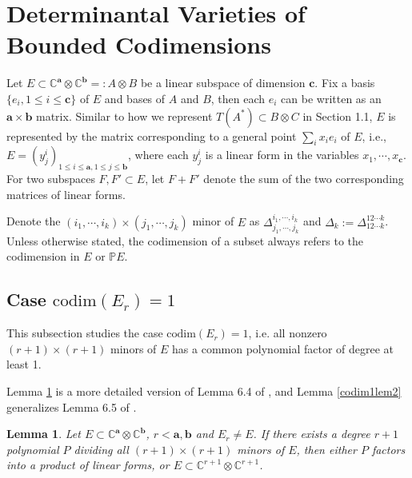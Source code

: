\documentclass[10pt]{article} %
\newcommand{\aaa}{\mathbf{a}}
\newcommand{\bbb}{\mathbf{b}}
\newcommand{\ccc}{\mathbf{c}}
\newcommand{\ot}{\otimes}
\newtheorem{lem}[thm]{Lemma}
\theoremstyle{definition}
\begin{document}
\section{Determinantal Varieties of Bounded Codimensions}\label{section:determinantal}
Let $E\subset\mathbb{C}^{\aaa}\otimes\mathbb{C}^{\bbb}=:A\otimes B$ be a linear subspace of dimension $\ccc$. Fix a basis $\{e_i,1\leq i \leq \ccc\}$ of $E$ and bases of $A$ and $B$, then each $e_i$ can be written as an $\aaa\times\bbb$ matrix. Similar to how we represent $T(A^*)\subset B\ot C$ in Section 1.1, $E$ is represented by the matrix corresponding to a general point $\sum_i x_ie_i$ of $E$, i.e., $E=(y^i_j)_{1\leq i\leq \aaa,1\leq j\leq \bbb}$, where each $y^i_j$ is a linear form in the variables $x_1,\cdots,x_{\ccc}$. For two subspaces $F,F'\subset E$, let $F+F'$ denote the sum of the two corresponding matrices of linear forms. 

Denote the $(i_1,\cdots,i_k)\times(j_1,\cdots,j_k)$ minor of $E$ as $\Delta^{i_1,\cdots,i_k}_{j_1,\cdots,j_k}$ and $\Delta_k:=\Delta^{12\cdots k}_{12\cdots k}$. Unless otherwise stated, the codimension of a subset always refers to the codimension in $E$ or $\mathbb{P}E$. 

\subsection{Case $\mathrm{codim}(E_r)=1$}
This subsection studies the case $\mathrm{codim}(E_r)=1$, i.e. all nonzero $(r+1)\times(r+1)$ minors of $E$ has a common polynomial factor of degree at least 1. 

Lemma \ref{codim1lem} is a more detailed version of Lemma 6.4 of \cite{GL20}, and Lemma \ref{codim1lem2} generalizes Lemma 6.5 of \cite{GL20}.

\begin{lem}\label{codim1lem}
Let $E\subset\mathbb{C}^{\aaa}\otimes\mathbb{C}^{\bbb}$, $r<\aaa,\bbb$ and $E_r\neq E$. If there exists a degree $r+1$ polynomial $P$ dividing all $(r+1)\times(r+1)$ minors of $E$, then either $P$ factors into a product of linear forms, or $E\subset\mathbb{C}^{r+1}\otimes\mathbb{C}^{r+1}$.
\end{lem}
\end{document}
